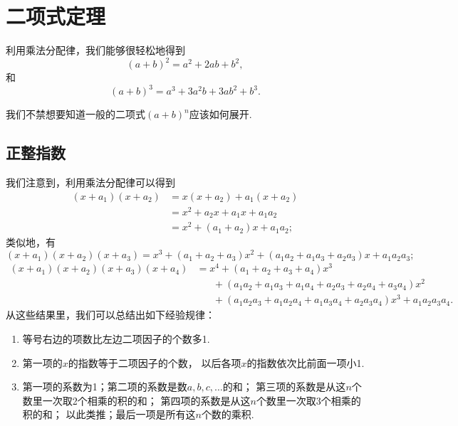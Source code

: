 \section{二项式定理}
利用乘法分配律，我们能够很轻松地得到
\begin{equation}
	(a + b)^2 = a^2 + 2ab + b^2,
\end{equation}
和
\begin{equation}
	(a + b)^3 = a^3 + 3 a^2 b + 3 a b^2 + b^3.
\end{equation}

我们不禁想要知道一般的二项式\((a+b)^n\)应该如何展开.

\subsection{正整指数}
我们注意到，利用乘法分配律可以得到\begin{align*}
	(x+a_1)(x+a_2)
	&= x(x+a_2) + a_1(x+a_2) \\
	&= x^2 + a_2x + a_1x + a_1a_2 \\
	&= x^2 + (a_1+a_2)x + a_1a_2;
\end{align*}
类似地，有\[
	(x+a_1)(x+a_2)(x+a_3)
	= x^3 + (a_1+a_2+a_3)x^2 + (a_1a_2+a_1a_3+a_2a_3)x + a_1a_2a_3;
\]\begin{align*}
	(x+a_1)(x+a_2)(x+a_3)(x+a_4)
	&= x^4 + (a_1+a_2+a_3+a_4)x^3 \\
		&\hspace{20pt}+ (a_1a_2+a_1a_3+a_1a_4+a_2a_3+a_2a_4+a_3a_4)x^2 \\
		&\hspace{20pt}+ (a_1a_2a_3+a_1a_2a_4+a_1a_3a_4+a_2a_3a_4)x^3 + a_1a_2a_3a_4.
\end{align*}
从这些结果里，我们可以总结出如下经验规律：
\begin{enumerate}
	\item 等号右边的项数比左边二项因子的个数多1.
	\item 第一项的\(x\)的指数等于二项因子的个数，
	以后各项\(x\)的指数依次比前面一项小1.
	\item 第一项的系数为1；第二项的系数是数\(a,b,c,\dotsc\)的和；
	第三项的系数是从这\(n\)个数里一次取2个相乘的积的和；
	第四项的系数是从这\(n\)个数里一次取3个相乘的积的和；
	以此类推；最后一项是所有这\(n\)个数的乘积.
\end{enumerate}

